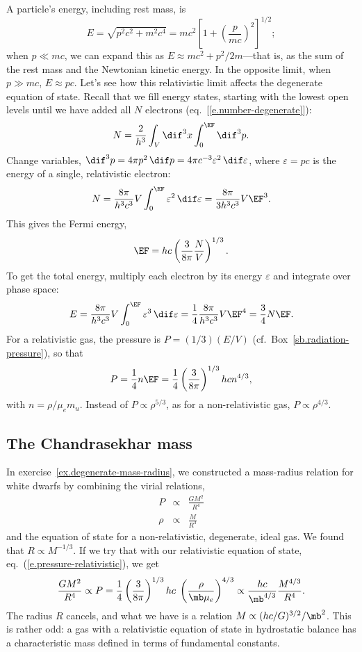 A particle's energy, including rest mass, is
\[
	E = \sqrt{p^{2}c^{2} + m^{2}c^{4}} = mc^{2}\left[1 + \left(\frac{p}{mc}\right)^{2}\right]^{1/2};
\]
when $p\ll mc$, we can expand this as $E\approx m c^{2} + p^{2}/2m$---that is, as the sum of the rest mass and the Newtonian kinetic energy. In the opposite limit, when $p \gg mc$, $E \approx pc$. Let's see how this relativistic limit affects the degenerate equation of state. Recall that we fill energy states, starting with the lowest open levels until we have added all $N$ electrons (eq.~[\ref{e.number-degenerate}]):
\[
	N = \frac{2}{h^{3}}\int_{V}\dif^{3}x\int_{0}^{\EF}\dif^{3}p.
\]
Change variables, $\dif^{3}p = 4\pi p^{2}\,\dif p = 4\pi c^{-3}\varepsilon^{2}\,\dif\varepsilon$, where $\varepsilon = pc$ is the energy of a single, relativistic electron:
\[
	N = \frac{8\pi}{h^{3}c^{3}}V \int_{0}^{\EF} \varepsilon^{2}\,\dif\varepsilon
	= \frac{8\pi}{3h^{3}c^{3}} V  \EF^{3}.
\]
This gives the Fermi energy,
\[
	\EF = hc\left(\frac{3}{8\pi}\frac{N}{V}\right)^{1/3}.
\]
To get the total energy, multiply each electron by its energy $\varepsilon$ and integrate over phase space:
\[
	E = \frac{8\pi}{h^{3}c^{3}}V\int_{0}^{\EF}\varepsilon^{3}\,\dif\varepsilon = 
		\frac{1}{4}\frac{8\pi}{h^{3}c^{3}}V\EF^{4} = \frac{3}{4}N\EF.
\]
For a relativistic gas, the pressure is $P = (1/3)(E/V)$ (cf.\ Box~\ref{sb.radiation-pressure}), so that
\begin{equation}
\label{e.pressure-relativistic}
	P = \frac{1}{4}n\EF = \frac{1}{4}\left(\frac{3}{8\pi}\right)^{1/3}hc n^{4/3},
\end{equation}
with $n = \rho/\mu_{e}m_{u}$. Instead of $P\propto\rho^{5/3}$, as for a non-relativistic gas, $P\propto\rho^{4/3}$.

\subsection{The Chandrasekhar mass}

In exercise~\ref{ex.degenerate-mass-radius}, we constructed a mass-radius relation for white dwarfs by combining the virial relations,
\begin{eqnarray*}
   P    &\propto& \frac{GM^{2}}{R^{4}}\\
   \rho &\propto& \frac{M}{R^{3}}
\end{eqnarray*}
and the equation of state for a non-relativistic, degenerate, ideal gas.  We found that $R\propto M^{-1/3}$.  If we try that with our relativistic equation of state, eq.~(\ref{e.pressure-relativistic}), we get
\[
	\frac{GM^{2}}{R^{4}} \propto P = \frac{1}{4}\left(\frac{3}{8\pi}\right)^{1/3}hc\; \left(\frac{\rho}{\mb\mu_{e}}\right)^{4/3} \propto \frac{hc}{\mb^{4/3}}\frac{M^{4/3}}{R^{4}}.
\]
The radius $R$ cancels, and what we have is a relation $M\propto (hc/G)^{3/2}/\mb^{2}$.  This is rather odd: a gas with a relativistic equation of state in hydrostatic balance has a characteristic mass defined in terms of fundamental constants.

